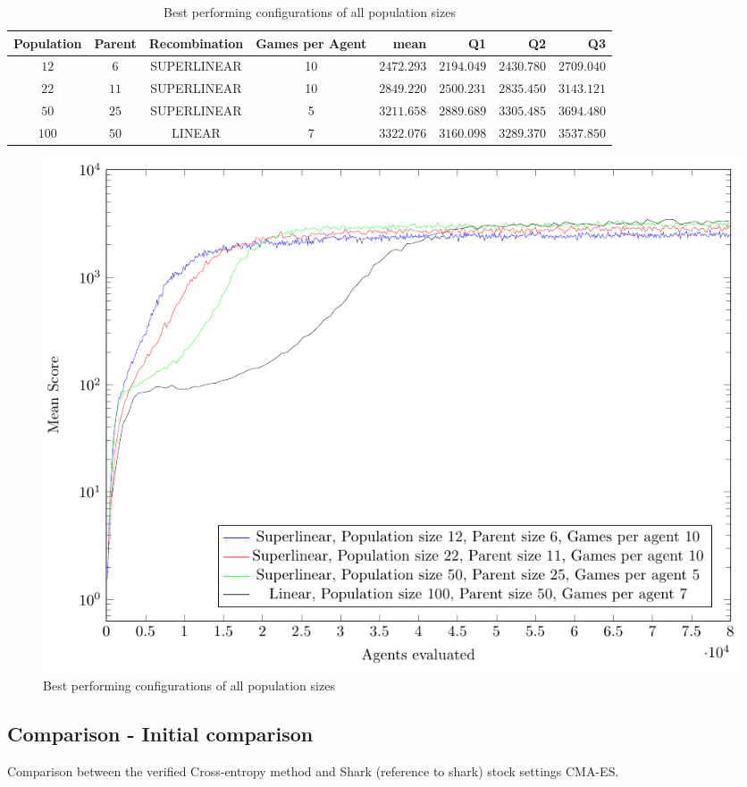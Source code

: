 \begin{table}[H]
\centering
\small
\begin{tabular}{c c c c r r r r}
Population & Parent & Recombination & Games per Agent & mean & Q1 & Q2 & Q3\\
\hline
$12$ & $6$ & SUPERLINEAR & 10 & $2472.293$ & $2194.049$ & $2430.780$ & $2709.040$\\
$22$ & $11$ & SUPERLINEAR & 10 & $2849.220$ & $2500.231$ & $2835.450$ & $3143.121$\\
$50$ & $25$ & SUPERLINEAR & 5 & $3211.658$ & $2889.689$ & $3305.485$ & $3694.480$\\
$100$ & $50$ & LINEAR & 7 & $3322.076$ & $3160.098$ & $3289.370$ & $3537.850$\\
\end{tabular}
\caption{Best performing configurations of all population sizes}
\end{table}

\begin{figure}[H]
\centering
\includegraphics[scale=1]{data/cma_population_offspring/bestofall_population/PlotFile.pdf}
\caption{Best performing configurations of all population sizes}
\end{figure}



\clearpage

\subsection{Comparison - Initial comparison}
Comparison between the verified Cross-entropy method and Shark (reference to shark) stock settings CMA-ES.

